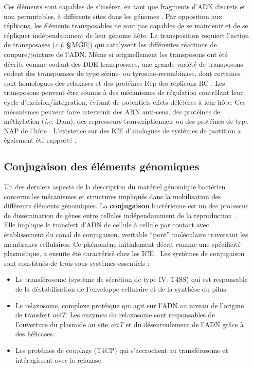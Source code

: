  
	Ces éléments sont capables de s'insérer, en tant que fragments d'ADN discrets et non permutables, à différents sites dans les génomes \citep{higgins2005bacterial}. Par opposition aux réplicons, les éléments transposables ne sont pas capables de se maintenir et de se répliquer indépendamment de leur génome hôte. La transposition requiert l'action de transposases (\textit{c.f.} \S \ref{MGE}) qui catalysent les différentes réactions de coupure/jointure de l'ADN. Même si originellement les transposons ont été décrits comme codant des DDE transposases, une grande variété de transposons codent des transposases de type sérine- ou tyrosine-recombinase, dont certaines sont homologues des relaxases et des protéines Rep des réplicons RC \citep{Roberts2008}. Les transposons peuvent être soumis à des mécanismes de régulation contrôlant leur cycle d'excision/intégration, évitant de potentiels effets délétères à leur hôte. Ces mécanismes peuvent faire intervenir des ARN anti-sens, des protéines de méthylation (\textit{i.e.} Dam), des represseurs transcriptionnels ou des protéines de type NAP de l'hôte \citep{cornet2004non}. L'existence sur des ICE d'analogues de systèmes de partition a également été rapporté \citep{Wozniak2010}. 

 
 \subsection{Conjugaison des éléments génomiques} \label{conj}
	Un des derniers aspects de la description du matériel génomique bactérien concerne les mécanismes et structures impliqués dans la mobilisation des différents éléments génomiques. La \textbf{conjugaison} bactérienne est un des processus de dissémination de gènes entre cellules indépendamment de la reproduction \citep{lawley2004bacterial}. Elle implique le transfert d'ADN de cellule à cellule par contact avec établissement du canal de conjugaison, veritable “pont” moléculaire traversant les membranes cellulaires. Ce phénomène initialement décrit comme une spécificité plasmidique, a ensuite été caractérisé chez les ICE \citep{Wozniak2010}. Les systèmes de conjugaison sont constitués de trois sous-systèmes essentiels \citep{lawley2004bacterial,Smillie2010}:
\begin{itemize}
	\item Le transférosome (système de sécrétion de type IV: T4SS) qui est responsable de la déstabilisation de l'enveloppe cellulaire et de la synthèse du pilus.
	\item Le relaxosome, complexe protéique qui agit sur l'ADN au niveau de l'origine de transfert \textit{oriT}. Les enzymes du relaxosome sont responsables de l'ouverture du plasmide au site \textit{oriT} et du désenroulement de l'ADN grâce à des hélicases.
	\item Les protéines de couplage (T4CP) qui s'accrochent au transférosome et intéragissent avec la relaxase.
 \end{itemize}

